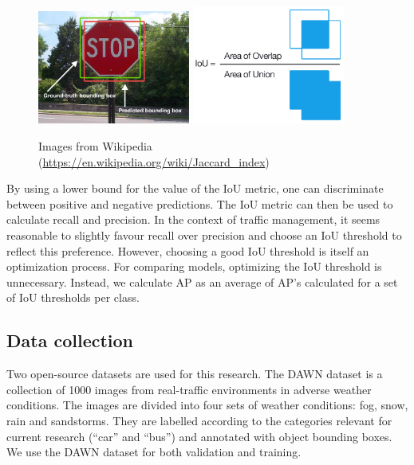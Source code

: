 \documentclass[]{article}
\begin{document}
	\begin{figure}[h]
		\centering
		\includegraphics[width=5cm]{Intersection_over_Union_-_object_detection_bounding_boxes.jpg}
		\includegraphics[width=5cm]{Intersection_over_Union_-_visual_equation.png}
		\caption{Images from Wikipedia \footnotesize{(\url{https://en.wikipedia.org/wiki/Jaccard_index})}}
	\end{figure}
	
	By using a lower bound for the value of the IoU metric, one can discriminate between positive and negative predictions. The IoU metric can then be used to calculate recall and precision. In the context of traffic management, it seems reasonable to slightly favour recall over precision and choose an IoU threshold to reflect this preference. However, choosing a good IoU threshold is itself an optimization process. For comparing models, optimizing the IoU threshold is unnecessary. Instead, we calculate AP as an average of AP's calculated for a set of IoU thresholds per class.

\subsection{Data collection}

	Two open-source datasets are used for this research. The DAWN dataset \cite{bw1x-yh39-20} is a collection of 1000 images from real-traffic environments in adverse weather conditions. The images are divided into four sets of weather conditions: fog, snow, rain and sandstorms. They are labelled according to the categories relevant for current research (``car'' and ``bus'') and annotated with object bounding boxes. We use the DAWN dataset for both validation and training.
	
\end{document}
